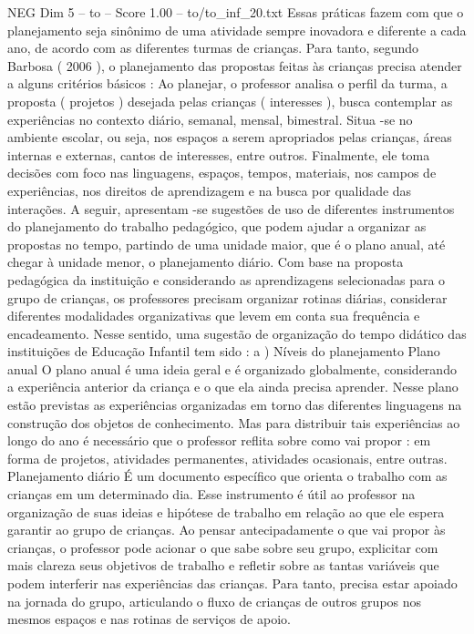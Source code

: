 \begin{textsample}{NEG Dim 5 – to – Score 1.00 – to/to\_inf\_20.txt}
Essas práticas fazem com que o planejamento seja sinônimo de uma atividade sempre inovadora e diferente a cada ano, de acordo com as diferentes turmas de crianças.
Para tanto, segundo Barbosa ( 2006 ), o planejamento das propostas feitas às crianças precisa atender a alguns critérios básicos : Ao planejar, o professor analisa o perfil da turma, a proposta ( projetos ) desejada pelas crianças ( interesses ), busca contemplar as experiências no contexto diário, semanal, mensal, bimestral.
Situa -se no ambiente escolar, ou seja, nos espaços a serem apropriados pelas crianças, áreas internas e externas, cantos de interesses, entre outros.
Finalmente, ele toma decisões com foco nas linguagens, espaços, tempos, materiais, nos campos de experiências, nos direitos de aprendizagem e na busca por qualidade das interações.
A seguir, apresentam -se sugestões de uso de diferentes instrumentos do planejamento do trabalho pedagógico, que podem ajudar a organizar as propostas no tempo, partindo de uma unidade maior, que é o plano anual, até chegar à unidade menor, o planejamento diário.
Com base na proposta pedagógica da instituição e considerando as aprendizagens selecionadas para o grupo de crianças, os professores precisam organizar rotinas diárias, considerar diferentes modalidades organizativas que levem em conta sua frequência e encadeamento.
Nesse sentido, uma sugestão de organização do tempo didático das instituições de Educação Infantil tem sido : a ) Níveis do planejamento Plano anual O plano anual é uma ideia geral e é organizado globalmente, considerando a experiência anterior da criança e o que ela ainda precisa aprender.
Nesse plano estão previstas as experiências organizadas em torno das diferentes linguagens na construção dos objetos de conhecimento.
Mas para distribuir tais experiências ao longo do ano é necessário que o professor reflita sobre como vai propor : em forma de projetos, atividades permanentes, atividades ocasionais, entre outras.
Planejamento diário É um documento específico que orienta o trabalho com as crianças em um determinado dia.
Esse instrumento é útil ao professor na organização de suas ideias e hipótese de trabalho em relação ao que ele espera garantir ao grupo de crianças.
Ao pensar antecipadamente o que vai propor às crianças, o professor pode acionar o que sabe sobre seu grupo, explicitar com mais clareza seus objetivos de trabalho e refletir sobre as tantas variáveis que podem interferir nas experiências das crianças.
Para tanto, precisa estar apoiado na jornada do grupo, articulando o fluxo de crianças de outros grupos nos mesmos espaços e nas rotinas de serviços de apoio.

\end{textsample}
